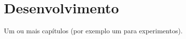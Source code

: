 \chapter[Desenvolvimento]{Desenvolvimento}

Um ou mais capítulos (por exemplo um para experimentos).